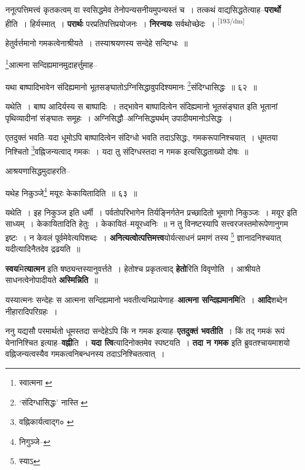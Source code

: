\documentclass[article,12pt,a4paper]{memoir}
\begin{document}
	  \pstart ननूत्पत्तिमत्त्वं कृतकत्वम् वा स्वसिद्धमेव तेनोपन्यसनीयमुपन्यस्तं च । तत्कथं वाद्यसिद्धतेत्याह--\textbf{परार्थो} हीति । हिर्यस्मात् । \textbf{परार्थः} परप्रतिपत्तिप्रयोजनः । \textbf{निरन्वयः} सर्वथोच्छेदः ।  \leavevmode\textsuperscript{\rmlatinfont\tiny [193/dm]} 
	  
	हेतुर्वर्त्तमानो गमकत्वेनाश्रीयते । तस्याश्रयणस्य सन्देहे सन्दिग्धः ॥ 
	  
	\footnote{स्वात्मना \cite{dp-msA} \cite{dp-msB} \cite{dp-msC} \cite{dp-msD} \cite{dp-edP} \cite{dp-edE} \cite{dp-edH} \cite{dp-edN}}आत्मना सन्दिह्यमानमुदाहर्त्तुमाह-- 
	  
	यथा बाष्पादिभावेन संदिह्यमानो भूतसङ्घातोऽग्निसिद्धावुपदिश्यमानः \footnote{‘संदिग्धासिद्धः’ नास्ति \cite{dp-msC}}संदिग्धासिद्धः ॥ ६२ ॥ 
	  
	यथेति । बाष्प आदिर्यस्य स बाष्पादिः । तद्भावेन बाष्पादित्वेन संदिह्यमानो भूतसंङ्घात इति भूतानां पृथिव्यादीनां संङ्घातः समूहः । अग्निसिद्धौ--अग्निसिद्ध्यर्थम् उपादीयमानोऽसिद्धः । 
	  
	एतदुक्तं भवति--यदा धूमोऽपि बाष्पादित्वेन संदिग्धो भवति तदाऽसिद्धः, गमकरूपानिश्चयात् । धूमतया निश्चितो \footnote{वह्निकार्यत्वाद्ग० \cite{dp-msC}}वह्निजन्यत्वाद् गमकः । यदा तु संदिग्धस्तदा न गमक इत्यसिद्धताख्यो दोषः ॥ 
	  
	आश्रयणासिद्धमुदाहरति-- 
	  
	यथेह निकुञ्जे\footnote{निगुञ्जे--\cite{dp-msC}} मयूरः केकायितादिति ॥ ६३ ॥ 
	  
	यथेति । इह निकुञ्ज इति धर्मी । पर्वतोपरिभागेन तिर्यङ्निर्गतेन प्रच्छादितो भूमागो निकुञ्जः । मयूर इति साध्यम् । केकायितादिति हेतुः । केकायितं--मयूरध्वनिः ॥ न तु विनष्टस्यापि सत्त्वरजस्तमोरूपेणानुगम इष्टः । न केवलं पूर्वमेवेत्यपिशब्दः । \textbf{अनित्यत्वोत्पत्तिमत्त्व}योर्यत्साधनं प्रमाणं तस्य \footnote{स्याऽ} ज्ञानादनिश्चयात् यदीत्यादिनैतदेव द्रढयति ॥
	\pend
      

	  \pstart \textbf{स्वय}मि\textbf{त्यात्मन} इति षष्ठ्यन्तस्यानुवर्त्तते । हेतोश्च प्रकृतत्वाद् \textbf{हेतो}रिति विवृणोति । आश्रीयते साधनत्वेनोपादीयते \textbf{अस्मिन्निति} ॥
	\pend
      

	  \pstart यस्यात्मनः सन्देहः स आत्मना सन्दिह्यमानो भवतीत्यभिप्रायेणाह--\textbf{आत्मना सन्दिह्यमानमि}ति । \textbf{आदि}शब्देन नीहारादिपरिग्रहः ।
	\pend
      

	  \pstart ननु यद्यसौ परमार्थतो धूमस्तदा सन्देहेऽपि किं न गमक इत्याह--\textbf{एतदुक्तं भवतीति} । किं तद् गमकं रूपं येनानिश्चित इत्याह--\textbf{वह्नी}ति । \textbf{यदा त्वि}त्यादिनोक्तमेव स्पष्टयति । \textbf{तदा न गमक} इति ब्रुवतश्चायमाशयो वह्निजन्यत्वस्यैव गमकत्वनिबन्धनस्य तदाऽनिश्चितत्वात् ।
	\pend
      
\end{document}
